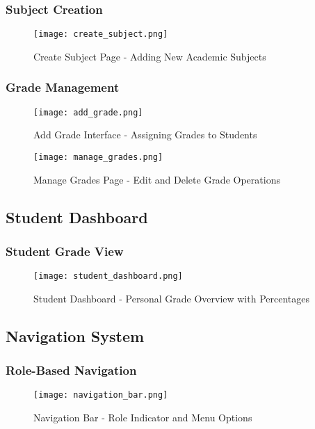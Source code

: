 \documentclass[12pt,a4paper]{article}
\begin{document}
\subsubsection{Subject Creation}
\begin{figure}[h]
\centering
\texttt{[image: create\_subject.png]}
\caption{Create Subject Page - Adding New Academic Subjects}
\label{fig:create_subject}
\end{figure}

\subsubsection{Grade Management}
\begin{figure}[h]
\centering
\texttt{[image: add\_grade.png]}
\caption{Add Grade Interface - Assigning Grades to Students}
\label{fig:add_grade}
\end{figure}

\begin{figure}[h]
\centering
\texttt{[image: manage\_grades.png]}
\caption{Manage Grades Page - Edit and Delete Grade Operations}
\label{fig:manage_grades}
\end{figure}

\subsection{Student Dashboard}

\subsubsection{Student Grade View}
\begin{figure}[h]
\centering
\texttt{[image: student\_dashboard.png]}
\caption{Student Dashboard - Personal Grade Overview with Percentages}
\label{fig:student_dash}
\end{figure}

\subsection{Navigation System}

\subsubsection{Role-Based Navigation}
\begin{figure}[h]
\centering
\texttt{[image: navigation\_bar.png]}
\caption{Navigation Bar - Role Indicator and Menu Options}
\label{fig:navigation}
\end{figure}
\end{document}
